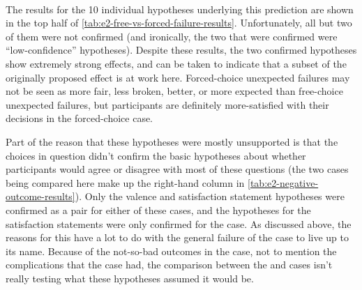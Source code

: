 \begin{table}[!p]
\centering
\bgroup
\def\arraystretch{1.3}
\setlength{\tabcolsep}{0.6em}
 \\[3ex]

\egroup
\caption[Retrospective free vs\@. forced failure results]{%
Retrospective hypotheses for the claim that ``Unexpected failure is more acceptable when it happens at a freely-chosen option than when the player feels there are no viable alternative options.''
%
The bottom half shows the results when choice 8638 is allowed to stand in for the entire \obvfm{} case.
%
Each line lists the hypothesis, the $p$-value, and if significant ($p < 0.05$), the common-language effect size.
%
Low-confidence hypotheses are marked with a `\lc/'.
%
Note that each pair of rows contains opposing predictions, because complementary questions are arranged together.}
  \label{tab:e2-free-vs-forced-failure-results}
\end{table}


The results for the 10 individual hypotheses underlying this prediction are shown in the top half of \cref{tab:e2-free-vs-forced-failure-results}.
%
Unfortunately, all but two of them were not confirmed (and ironically, the two that were confirmed were ``low-confidence'' hypotheses).
%
Despite these results, the two confirmed hypotheses show extremely strong effects, and can be taken to indicate that a subset of the originally proposed effect is at work here.
%
Forced-choice unexpected failures may not be seen as more fair, less broken, better, or more expected than free-choice unexpected failures, but participants are definitely more-satisfied with their decisions in the forced-choice case.


Part of the reason that these hypotheses were mostly unsupported is that the choices in question didn't confirm the basic hypotheses about whether participants would agree or disagree with most of these questions (the two cases being compared here make up the right-hand column in \cref{tab:e2-negative-outcome-results}).
%
Only the valence and satisfaction statement hypotheses were confirmed as a pair for either of these cases, and the hypotheses for the satisfaction statements were only confirmed for the \unxf{} case.
%
As discussed above, the reasons for this have a lot to do with the general failure of the \obvfm{} case to live up to its name.
%
Because of the not-so-bad outcomes in the \obvfm{} case, not to mention the complications that the \unxf{} case had, the comparison between the \unxf{} and \obvfm{} cases isn't really testing what these hypotheses assumed it would be.


